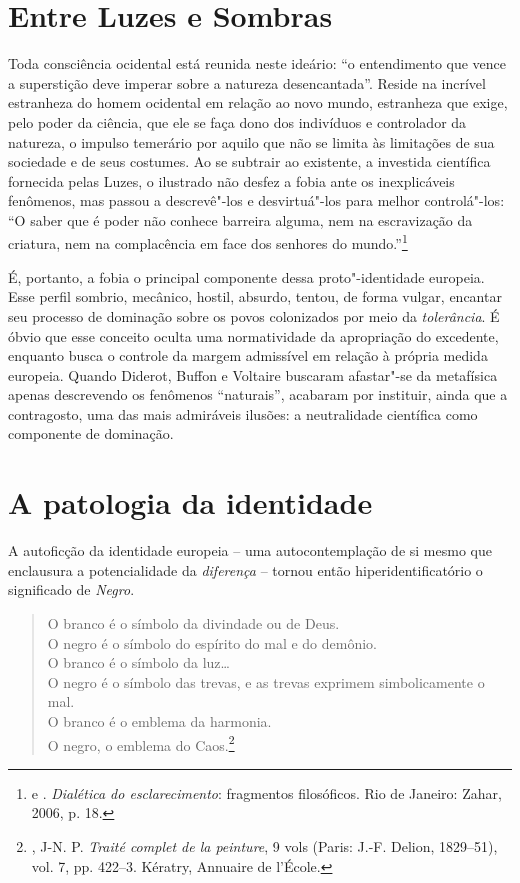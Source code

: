 \chapter{Entre Luzes e Sombras}

Toda consciência ocidental está reunida neste ideário: ``o entendimento
que vence a superstição deve imperar sobre a natureza desencantada''.
Reside na incrível estranheza do homem ocidental em relação ao novo
mundo, estranheza que exige, pelo poder da ciência, que ele se faça dono
dos indivíduos e controlador da natureza, o impulso temerário por aquilo
que não se limita às limitações de sua sociedade e de seus costumes. Ao
se subtrair ao existente, a investida científica fornecida pelas Luzes,
o ilustrado não desfez a fobia ante os inexplicáveis fenômenos, mas
passou a descrevê"-los e desvirtuá"-los para melhor controlá"-los:
``O saber que é poder não conhece
barreira alguma, nem na escravização da criatura, nem na complacência em
face dos senhores do mundo.''\footnote{ e .
  \emph{Dialética do esclarecimento}: fragmentos filosóficos. Rio de
  Janeiro: Zahar, 2006, p. 18.}

É, portanto, a fobia o principal componente dessa proto"-identidade
europeia. Esse perfil sombrio, mecânico, hostil, absurdo, tentou, de
forma vulgar, encantar seu processo de dominação sobre os povos
colonizados por meio da \emph{tolerância}.
É óbvio que esse conceito oculta
uma normatividade da apropriação do excedente, enquanto busca o controle
da margem admissível em relação à própria medida europeia. Quando
Diderot, Buffon e Voltaire buscaram afastar"-se da metafísica apenas descrevendo os fenômenos ``naturais'', acabaram por instituir, ainda que
a contragosto, uma das mais admiráveis ilusões: a neutralidade
científica como componente de dominação.

\chapter{A patologia da identidade}

A autoficção da identidade europeia -- uma autocontemplação de si mesmo
que enclausura a potencialidade da \emph{diferença} -- tornou então
hiperidentificatório o significado de \emph{Negro}.

\begin{verse}
O branco é o símbolo da divindade ou de Deus.\\
O negro é o símbolo do espírito do mal e do demônio.\\
O branco é o símbolo da luz\ldots{}\\
O negro é o símbolo das trevas, e as trevas exprimem \qb{}simbolicamente o mal.\\
O branco é o emblema da harmonia.\\
O negro, o emblema do Caos.\footnote{, J-N. P. \emph{Traité complet de la peinture}, 9 vols (Paris: J.-F. Delion, 1829–51), vol. 7, pp. 422--3. Kératry, Annuaire de l'École.}
\end{verse}

